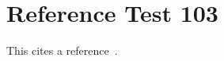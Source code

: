 \documentclass{article}
\begin{document}
\section{Reference Test 103}
This cites a reference~\cite{test103}.

\end{document}
